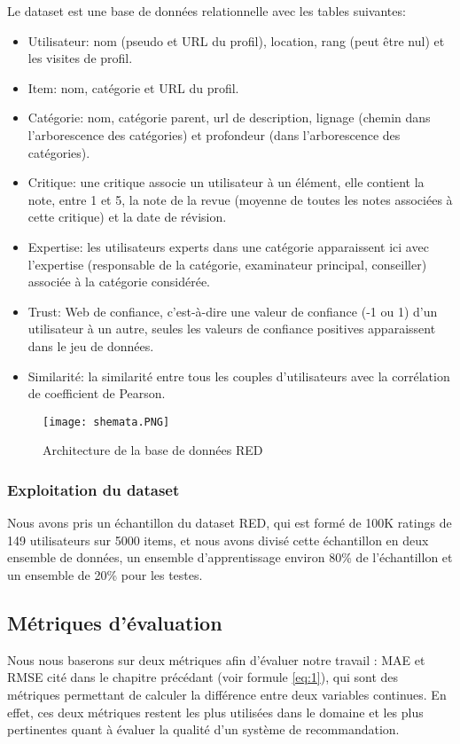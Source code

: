 Le dataset est une base de données relationnelle avec les tables suivantes:
\begin{itemize}
	\item Utilisateur: nom (pseudo et URL du profil), location, rang (peut être nul) et les visites de profil.
	\item Item: nom, catégorie et URL du profil.
	\item  Catégorie: nom, catégorie parent, url de description, lignage (chemin dans l'arborescence des catégories) et profondeur (dans l'arborescence des catégories).
	\item Critique: une critique associe un utilisateur à un élément, elle contient la note, entre 1 et 5, la note de la revue (moyenne de toutes les notes associées à cette critique) et la date de révision.
	\item Expertise: les utilisateurs experts dans une catégorie apparaissent ici avec l'expertise (responsable de la catégorie, examinateur principal, conseiller) associée à la catégorie considérée.
	\item Trust: Web de confiance, c’est-à-dire une valeur de confiance (-1 ou 1) d’un utilisateur à un autre, seules les valeurs de confiance positives apparaissent dans le jeu de données.
	\item Similarité: la similarité entre tous les couples d'utilisateurs avec la corrélation de coefficient de Pearson. 
\end{itemize}

\begin{figure}[H]
	\centering
	\texttt{[image: shemata.PNG]}
	\caption{Architecture de la base de données RED}
	\label{fig:shemta}
\end{figure}
\subsubsection*{Exploitation du dataset}
Nous avons pris un échantillon du dataset RED, qui est formé de 100K ratings de 149 utilisateurs sur 5000 items, et nous avons divisé cette échantillon en deux ensemble de données, un ensemble d'apprentissage environ 80\% de l'échantillon et un ensemble de 20\% pour les testes. 
\subsection{Métriques d'évaluation}
Nous nous baserons sur deux métriques afin d’évaluer notre travail : MAE et RMSE cité dans le chapitre précédant (voir formule \ref{eq:1}), qui sont des métriques permettant de calculer la différence
entre deux variables continues. En effet, ces deux métriques restent les plus utilisées dans le domaine et les plus pertinentes quant à évaluer la qualité d’un système de recommandation.

